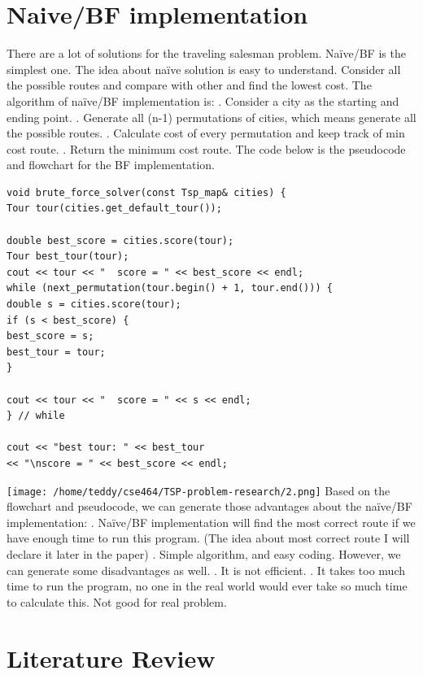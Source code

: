 \documentclass[a4paper,man,natbib]{apa6}
\begin{document}
\section{Naive/BF implementation}
There are a lot of solutions for the traveling salesman problem. Naïve/BF is the simplest one. The idea about naïve solution is easy to understand. Consider all the possible routes and compare with other and find the lowest cost. The algorithm of naïve/BF implementation is:
. Consider a city as the starting and ending point.
. Generate all (n-1) permutations of cities, which means generate all the possible routes.
. Calculate cost of every permutation and keep track of min cost route.
. Return the minimum cost route. 
\newline 
The code below is the pseudocode and flowchart for the BF implementation.
\begin{lstlisting}
void brute_force_solver(const Tsp_map& cities) {
Tour tour(cities.get_default_tour());

double best_score = cities.score(tour);
Tour best_tour(tour);
cout << tour << "  score = " << best_score << endl;
while (next_permutation(tour.begin() + 1, tour.end())) {
double s = cities.score(tour);
if (s < best_score) {
best_score = s;
best_tour = tour;
}

cout << tour << "  score = " << s << endl;
} // while
 
cout << "best tour: " << best_tour
<< "\nscore = " << best_score << endl;
\end{lstlisting}
\texttt{[image: /home/teddy/cse464/TSP-problem-research/2.png]}
Based on the flowchart and pseudocode, we can generate those advantages about the naïve/BF implementation:
. Naïve/BF implementation will find the most correct route if we have enough time to run this program. (The idea about most correct route I will declare it later in the paper)
. Simple algorithm, and easy coding.
\newline 
However, we can generate some disadvantages as well.
. It is not efficient. 
. It takes too much time to run the program, no one in the real world would ever take so much time to calculate this. Not good for real problem.

\section{Literature Review}
\end{document}
